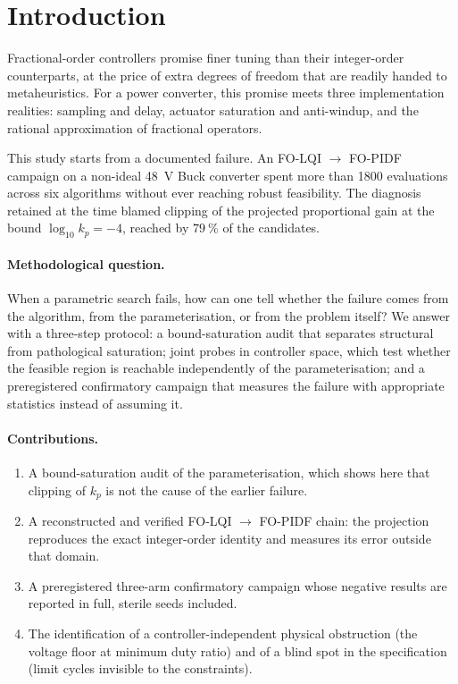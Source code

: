 \section{Introduction}
\label{sec:intro}

Fractional-order controllers promise finer tuning than their integer-order
counterparts, at the price of extra degrees of freedom that are readily handed
to metaheuristics. For a power converter, this promise meets three
implementation realities: sampling and delay, actuator saturation and
anti-windup, and the rational approximation of fractional operators.

This study starts from a documented failure. An FO-LQI $\to$ FO-PIDF campaign
on a non-ideal 48~V Buck converter spent more than 1800 evaluations across six
algorithms without ever reaching robust feasibility. The diagnosis retained at
the time blamed clipping of the projected proportional gain at the bound
$\log_{10}k_p=-4$, reached by $79~\%$ of the candidates.

\paragraph{Methodological question.}
When a parametric search fails, how can one tell whether the failure comes
from the algorithm, from the parameterisation, or from the problem itself? We
answer with a three-step protocol: a bound-saturation audit that separates
structural from pathological saturation; joint probes in controller space,
which test whether the feasible region is reachable independently of the
parameterisation; and a preregistered confirmatory campaign that measures the
failure with appropriate statistics instead of assuming it.

\paragraph{Contributions.}
\begin{enumerate}
\item A bound-saturation audit of the parameterisation, which shows here that
  clipping of $k_p$ is not the cause of the earlier failure.
\item A reconstructed and verified FO-LQI $\to$ FO-PIDF chain: the projection
  reproduces the exact integer-order identity and measures its error outside
  that domain.
\item A preregistered three-arm confirmatory campaign whose negative results
  are reported in full, sterile seeds included.
\item The identification of a controller-independent physical obstruction
  (the voltage floor at minimum duty ratio) and of a blind spot in the
  specification (limit cycles invisible to the constraints).
\end{enumerate}
